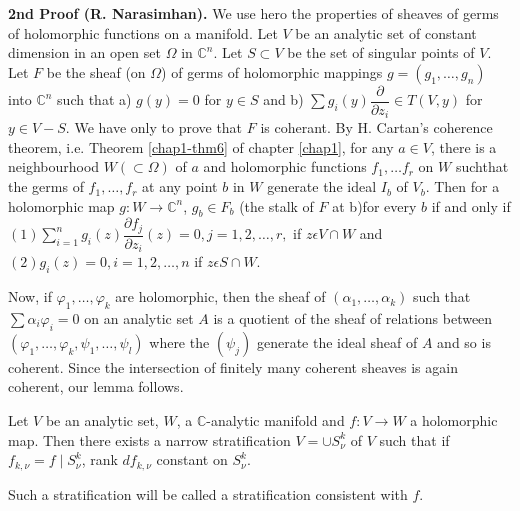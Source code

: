 \medskip
\noindent
\textbf{2nd Proof (R. Narasimhan).} We use hero the properties of sheaves of
germs of holomorphic functions on a manifold. Let $V$ be an analytic
set of constant dimension in an open set $\Omega$ in
$\mathbb{C}^n$. Let $S \subset V$ be the set of singular points of
$V$. Let $F$ be the sheaf (on $\Omega$) of germs of holomorphic
mappings $g = (g_1,\ldots, g_n)$ into $\mathbb{C}^n$ such that a)
$g(y) = 0$ for $y \in S$ and b) $\sum
g_i(y)\dfrac{\partial}{\partial z_i}\in T(V,y)$ for $y\in
V-S$. We have only to prove that $F$ is coherant. By H. Cartan's coherence
theorem, i.e. Theorem \ref{chap1-thm6} of chapter \ref{chap1}, for any
$a \in V$, 
there is a neighbourhood $W(\subset \Omega)$ of $a$ and holomorphic
functions $f_1,\ldots f_r$ on $W$ such\pageoriginale that the germs of
$f_1,\ldots,f_r$ at any point $b$ in $W$ generate the  ideal $I_b$ of
$V_b$. Then for a holomorphic map $g:W \rightarrow \mathbb{C}^n$, 
$g_b \in F_b$ (the stalk of $F$ at b)for every $b$ if and only if
$(1)\sum \limits^n_{i=1} g_i(z)\dfrac{\partial f_j}{\partial z_i}
(z)=0, j=1,2,\ldots,r,$ if $z \epsilon V \cap W$ and $(2) g_i(z) = 0,
i = 1,2,\ldots, n$ if $z \epsilon S \cap W$. 

Now, if $\varphi_1,\ldots, \varphi_k$ are holomorphic, then the sheaf
of $(\alpha_1,\ldots,\alpha_k)$ such that $\sum \alpha_i \varphi_i
= 0$ on an analytic set $A$ is a quotient of the sheaf of relations
between $(\varphi_1,\ldots,\varphi_k, \psi_1,\ldots,\psi_{l})$ where the
$(\psi_j)$ generate the ideal sheaf of $A$ and so is coherent. Since
the intersection of finitely many coherent sheaves is again coherent,
our lemma follows. 

\begin{proposition}\label{chap2-prop3} %
  Let $V$ be an analytic set, $W$, a $\mathbb{C}$-analytic manifold
  and $f:V \rightarrow W$ a holomorphic map. Then there exists a narrow
  stratification $V = \cup S^k_\nu$ of $V$ such that if $f_{k,\nu}=f\mid
  S^k_\nu$, rank $df_{k,\nu}$ constant on $S^k_\nu$. 
\end{proposition}

Such a stratification will be called a stratification consistent with $f$.

